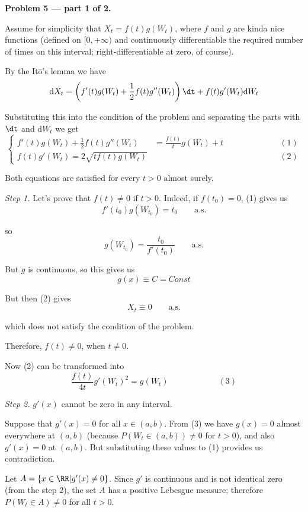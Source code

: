 \documentclass[12pt, a4paper]{article}
\newcommand{\ds}{\displaystyle}
\begin{document}
\textbf{Problem 5 — part 1 of 2.}\par
Assume for simplicity that $X_{t} = f(t)g(W_{t})$, where $f$ and $g$ are kinda nice functions (defined on $[0, +\infty)$ and continuously differentiable the required number of times on this interval; right-differentiable at zero, of course).\par
By the It$\hat{\mbox{o}}$'s lemma we have
$$
\mathrm{d}X_{t} = \left(f'(t)g(W_{t}) + \frac{\ds 1}{\ds 2}f(t)g''(W_{t})\right)\dt + f(t)g'(W_{t})\mathrm{d}W_{t}
$$\par
Substituting this into the condition of the problem and separating the parts with $\dt$ and $\mathrm{d}W_{t}$ we get
$$
\left\{
\begin{aligned}
f'(t)g(W_{t})+\frac{\ds 1}{\ds 2}f(t)g''(W_{t})  &= \frac{\ds f(t)}{\ds t}g(W_{t}) + t\qquad\qquad\qquad &(1)\\
 f(t)g'(W_{t}) = 2\sqrt{tf(t)g(W_{t})} & \qquad\qquad\qquad &(2)
\end{aligned}
\right.
$$\par
Both equations are satisfied for every $t > 0$ almost surely.\[\]\par
\textit{Step 1.} Let's prove that $f(t) \neq 0$ if $t > 0$. Indeed, if $f(t_{0}) = 0$, (1) gives us
$$
f'(t_{0}) g(W_{t_{0}}) = t_{0}\qquad \mbox{a.s.}
$$\par
so
$$
g(W_{t_{0}}) = \frac{\ds t_{0}}{\ds f'(t_{0})}\qquad \mbox{a.s.}
$$\par
But $g$ is continuous, so this gives us
$$
g(x) \equiv C = Const
$$ \par
But then (2) gives
$$
X_{t} \equiv 0 \qquad \mbox{a.s.}
$$\par
which does not satisfy the condition of the problem.\par
Therefore, $f(t) \neq 0$, when $t \neq 0$.\[\]\par
Now (2) can be transformed into
$$
\frac{\ds f(t)}{\ds 4t}g'(W_{t})^{2} = g(W_{t})\qquad\qquad\qquad (3)
$$\par
\textit{Step 2.} $g'(x)$ cannot be zero in any interval.\par
Suppose that $g'(x) = 0$ for all $x \in (a,b)$. From (3) we have $g(x) = 0$ almost everywhere at $(a,b)$ (because $P(W_{t} \in (a,b)) \neq 0$ for $t > 0$), and also $g'(x) = 0$ at $(a,b)$. But substituting these values to (1) provides us contradiction.\[\]\par
Let $A = \{x \in \RR | g'(x) \neq 0\}$. Since $g'$ is continuous and is not identical zero (from the step 2), the set $A$ has a positive Lebesgue measure; therefore $P(W_{t} \in A) \neq 0$ for all $t > 0$.
\end{document}
